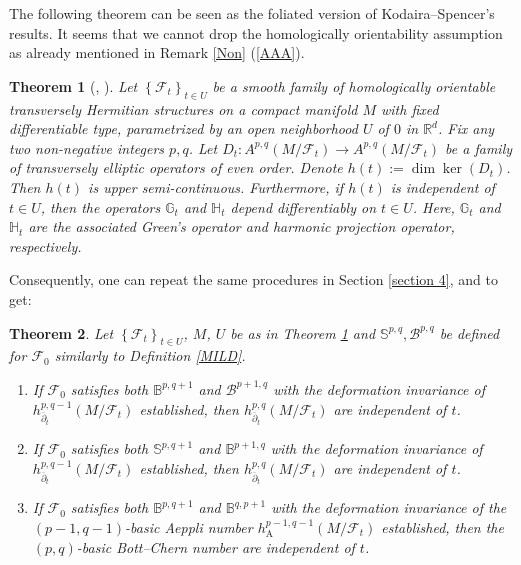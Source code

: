 \documentclass[12pt]{amsart}
\numberwithin{equation}{section}
\newtheorem{theorem} {Theorem} [section]
\theoremstyle{definition}
\theoremstyle{definition}
\theoremstyle{definition}
\renewcommand{\1}{\mathsf{1}}
\newcommand{\db}{\overline{\partial}}
\renewcommand{\>}{\rightarrow}
\def\mb{\mathbb}
\def\mc{\mathcal}
\theoremstyle{plain} %
\theoremstyle{plain} %
\theoremstyle{plain} %
\begin{document}
	The following theorem can be seen as the foliated version of Kodaira--Spencer's results. It seems that  we cannot drop the homologically orientability assumption as already mentioned in Remark
	\ref{Non} (\ref{AAA}).
	\begin{theorem}
		[{\cite[Theorem 5.4]{EKAG97}, \cite[Theorem 4.5]{Ra21}}]\label{ks foliation}
		Let $\left\{\mc F_t\right\}_{t\in U}$ be a smooth family of homologically orientable transversely Hermitian structures on a compact  manifold $M$ with fixed differentiable type, parametrized by an open neighborhood $U$ of $0$ in $\mathbb{R}^{d}$.  Fix any two non-negative integers $p,q$.   Let $D_t: A^{p,q}(M/\mc F_t)\rightarrow A^{p,q}(M/\mc F_t)$ be a family of transversely elliptic operators of even order. Denote $h(t):=\dim \ker(D_t)$. Then $h(t)$ is upper semi-continuous. Furthermore, if $h(t)$ is independent of $t\in U$, then the operators $\mb G_t$ and $\mb H_t$ depend differentiably on $t\in U$. Here, $\mb G_t$ and $\mb H_t$ are the associated Green's operator and harmonic projection operator, respectively.
	\end{theorem}
	
	Consequently, one can repeat the same procedures in Section \ref{section 4}, \cite[Section 3]{RZ18} and \cite[Section 5]{RWZ19} to get:
	\begin{theorem}\label{basic hodge}
		Let $\left\{\mc F_t\right\}_{t\in U}$, $M$, $U$ be as in Theorem \ref{ks foliation} and $\mb S^{p,q},\mathcal B^{p,q}$ be defined for $\mc F_0$ similarly to Definition \ref{MILD}.
		\begin{enumerate}[$(a)$]
			\item If $\mc F_0$ satisfies both
			$\mathbb{B}^{p,q+1}$ and $\mathcal{B}^{p+1,q}$ with
			the deformation invariance of $h^{p,q-1}_{\db_t}(M/\mc F_t)$ established,
			then $h^{p,q}_{\db_t}(M/\mc F_t)$ are independent of $t$.
			\item If $\mc F_0$ satisfies both $\mb S^{p,q+1}$ and  $\mb B^{p+1,q}$ with
			the deformation invariance of $h^{p,q-1}_{\db_t}(M/\mc F_t)$ established,
			then $h^{p,q}_{\db_t}(M/\mc F_t)$ are independent of $t$.
			\item   If $\mc F_0$ satisfies both
			$\mathbb{B}^{p,q+1}$ and $\mathbb{B}^{q,p+1}$ with the deformation invariance of the $(p-1,q-1)$-basic Aeppli number $h^{p-1,q-1}_{\mathrm{A}}(M/\mc F_t)$ established, then the $(p,q)$-basic Bott--Chern number are  independent of $t$.
		\end{enumerate}
	\end{theorem}
	
\end{document}
